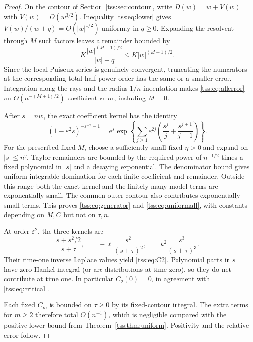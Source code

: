 \documentclass[11pt]{article}
\theoremstyle{remark}\newtheorem{remark}[theorem]{Remark}
\theoremstyle{definition}\newtheorem{definition}[theorem]{Definition}
\newcommand{\e}{\mathrm e}
\begin{document}
\begin{proof}
On the contour of Section~\ref{tss:sec:contour}, write $D(w)=w+V(w)$ with $V(w)=O(w^{3/2})$. Inequality \eqref{tss:eq:lower} gives
$V(w)/(w+q)=O(|w|^{1/2})$ uniformly in $q\geq0$. Expanding the resolvent through $M$ such factors leaves a remainder bounded by
\begin{equation}\label{tss:eq:allerror}
K\frac{|w|^{(M+1)/2}}{|w|+q}\leq K|w|^{(M-1)/2}.
\end{equation}
Since the local Puiseux series is genuinely convergent, truncating the numerators at the corresponding total half-power order has the same or a smaller error. Integration along the rays and the radius-$1/n$ indentation makes \eqref{tss:eq:allerror} an $O(n^{-(M+1)/2})$ coefficient error, including $M=0$.

After $s=nw$, the exact coefficient kernel has the identity
\begin{equation}\label{tss:eq:cauchyexp}
(1-\varepsilon^2s)^{-\varepsilon^{-2}-1}
 =\e^s\exp\left\{\sum_{j\geq1}\varepsilon^{2j}
               \left(\frac{s^j}{j}+\frac{s^{j+1}}{j+1}\right)\right\}.
\end{equation}
For the prescribed fixed $M$, choose a sufficiently small fixed $\eta>0$ and expand on $|s|\leq n^\eta$. Taylor remainders are bounded by the required power of $n^{-1/2}$ times a fixed polynomial in $|s|$ and a decaying exponential. The denominator bound gives uniform integrable domination for each finite coefficient and remainder. Outside this range both the exact kernel and the finitely many model terms are exponentially small. The common outer contour also contributes exponentially small terms. This proves \eqref{tss:eq:generator} and \eqref{tss:eq:uniformall}, with constants depending on $M,C$ but not on $\tau,n$.

At order $\varepsilon^2$, the three kernels are
\[
\frac{s+s^2/2}{s+\tau},\qquad
-\ell\frac{s^2}{(s+\tau)^2},\qquad
k^2\frac{s^3}{(s+\tau)^3}.
\]
Their time-one inverse Laplace values yield \eqref{tss:eq:C2}. Polynomial parts in $s$ have zero Hankel integral (or are distributions at time zero), so they do not contribute at time one. In particular $C_2(0)=0$, in agreement with \eqref{tss:eq:critical}.

Each fixed $C_m$ is bounded on $\tau\geq0$ by its fixed-contour integral. The extra terms for $m\geq2$ therefore total $O(n^{-1})$, which is negligible compared with the positive lower bound from Theorem~\ref{tss:thm:uniform}. Positivity and the relative error follow.
\end{proof}
\end{document}
